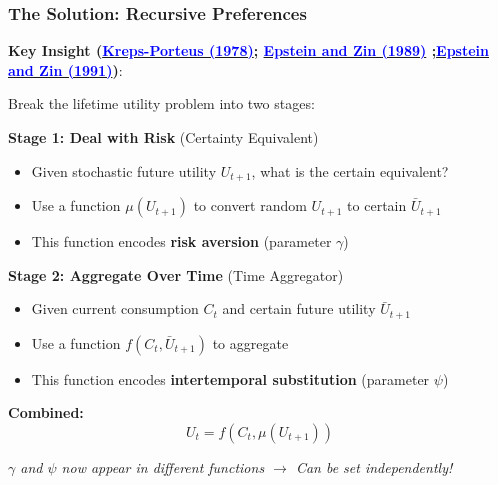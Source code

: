 \documentclass{beamer}
\begin{document}
\begin{frame}
    \frametitle{The Solution: Recursive Preferences}
    
    \textbf{Key Insight (\href{https://doi.org/10.2307/1913656}{\textcolor{blue}{Kreps-Porteus (1978)}}; \href{https://doi.org/10.2307/1913778}{\textcolor{blue}{Epstein and Zin (1989)}} ;\href{https://www.journals.uchicago.edu/doi/10.1086/261750} {\textcolor{blue}{Epstein and Zin (1991)}})}:
    
    Break the lifetime utility problem into two stages:
    
    
    \textbf{Stage 1: Deal with Risk} (Certainty Equivalent)
    \begin{itemize}
        \item Given stochastic future utility $U_{t+1}$, what is the certain equivalent?
        \item Use a function $\mu(U_{t+1})$ to convert random $U_{t+1}$ to certain $\bar{U}_{t+1}$
        \item This function encodes \textbf{risk aversion} (parameter $\gamma$)
    \end{itemize}
    
    
    \textbf{Stage 2: Aggregate Over Time} (Time Aggregator)
    \begin{itemize}
        \item Given current consumption $C_t$ and certain future utility $\bar{U}_{t+1}$
        \item Use a function $f(C_t, \bar{U}_{t+1})$ to aggregate
        \item This function encodes \textbf{intertemporal substitution} (parameter $\psi$)
    \end{itemize}
    
    
    \textbf{Combined:}
    \begin{equation*}
        \boxed{
        U_t = f(C_t, \mu(U_{t+1}))
        }
    \end{equation*}
    
    
    \textit{$\gamma$ and $\psi$ now appear in different functions $\rightarrow$ Can be set independently!}
    
\end{frame}
\end{document}
